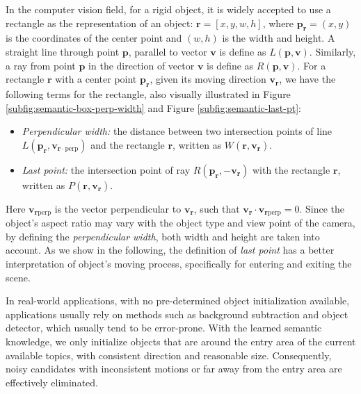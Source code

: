     In the computer vision field, for a rigid object, it is widely accepted to use a rectangle as the representation of an object: $\bm{r} = [x, y, w, h]$, where $\bm{p_r}=(x, y)$ is the coordinates of the center point and $(w, h)$ is the width and height.
    A straight line through point $\bm{p}$, parallel to vector $\bm{v}$ is define as $L(\bm{p}, \bm{v})$. Similarly, a ray from point $\bm{p}$ in the direction of vector $\bm{v}$ is define as $R(\bm{p}, \bm{v})$.
    For a rectangle $\bm{r}$ with a center point $\bm{p_r}$, given its moving direction $\bm{v_r}$, we have the following terms for the rectangle, also visually illustrated in Figure \ref{subfig:semantic-box-perp-width} and Figure \ref{subfig:semantic-last-pt}:  
    \begin{itemize}
        \item \emph{Perpendicular width:} the distance between two intersection points of line $L(\bm{p_r}, \bm{v}_{\bm{r}\cdot\text{perp}})$ and the rectangle $\bm{r}$, written as $W(\bm{r}, \bm{v_r})$. 
        \item \emph{Last point:} the intersection point of ray $R(\bm{p_r}, \bm{-v_r})$ with the rectangle $\bm{r}$, written as $P(\bm{r}, \bm{v_r})$.
    \end{itemize}
    Here $\bm{v}_{\bm{r}\text{perp}}$ is the vector perpendicular to $\bm{v_r}$, such that $\bm{v_r}\cdot\bm{v}_{\bm{r}\text{perp}}=0$. Since the object's aspect ratio may vary with the object type and view point of the camera, by defining the \emph{perpendicular width}, both width and height are taken into account. As we show in the following, the definition of \emph{last point} has a better interpretation of object's moving process, specifically for entering and exiting the scene.

    

    In real-world applications, with no pre-determined object initialization available, applications usually rely on methods such as background subtraction and object detector, which usually tend to be error-prone.
    With the learned semantic knowledge, we only initialize objects that are around the entry area of the current available topics, with consistent direction and reasonable size. Consequently, noisy candidates with inconsistent motions or far away from the entry area are effectively eliminated. 


